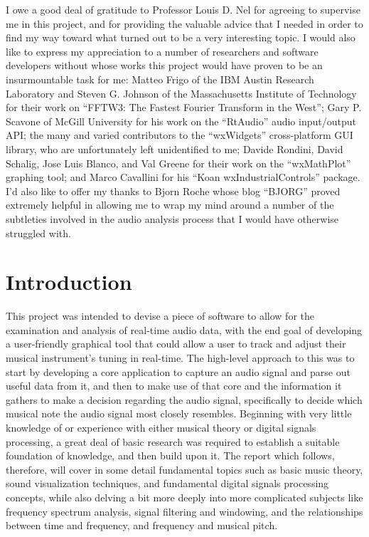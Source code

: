 \documentclass[12pt]{report}
\begin{document}
\indent I owe a good deal of gratitude to Professor Louis D. Nel for agreeing to supervise me in this project, and for providing the valuable advice that I needed in order to find my way toward what turned out to be a very interesting topic. I would also like to express my appreciation to a number of researchers and software developers without whose works this project would have proven to be an insurmountable task for me: Matteo Frigo of the IBM Austin Research Laboratory and Steven G. Johnson of the Massachusetts Institute of Technology for their work on ``FFTW3: The Fastest Fourier Transform in the West''; Gary P. Scavone of McGill University for his work on the ``RtAudio'' audio input/output API; the many and varied contributors to the ``wxWidgets'' cross-platform GUI library, who are unfortunately left unidentified to me; Davide Rondini, David Schalig, Jose Luis Blanco, and Val Greene for their work on the ``wxMathPlot'' graphing tool; and Marco Cavallini for his ``Koan wxIndustrialControls'' package. I'd also like to offer my thanks to Bjorn Roche whose blog ``BJORG'' proved extremely helpful in allowing me to wrap my mind around a number of the subtleties involved in the audio analysis process that I would have otherwise struggled with.
\clearpage

\tableofcontents
\clearpage

\listoffigures
\clearpage


\chapter{Introduction}
\indent This project was intended to devise a piece of software to allow for the examination and analysis of real-time audio data, with the end goal of developing a user-friendly graphical tool that could allow a user to track and adjust their musical instrument's tuning in real-time. The high-level approach to this was to start by developing a core application to capture an audio signal and parse out useful data from it, and then to make use of that core and the information it gathers to make a decision regarding the audio signal, specifically to decide which musical note the audio signal most closely resembles. Beginning with very little knowledge of or experience with either musical theory or digital signals processing, a great deal of basic research was required to establish a suitable foundation of knowledge, and then build upon it. The report which follows, therefore, will cover in some detail fundamental topics such as basic music theory, sound visualization techniques, and fundamental digital signals processing concepts, while also delving a bit more deeply into more complicated subjects like frequency spectrum analysis, signal filtering and windowing, and the relationships between time and frequency, and frequency and musical pitch. 
\end{document}

